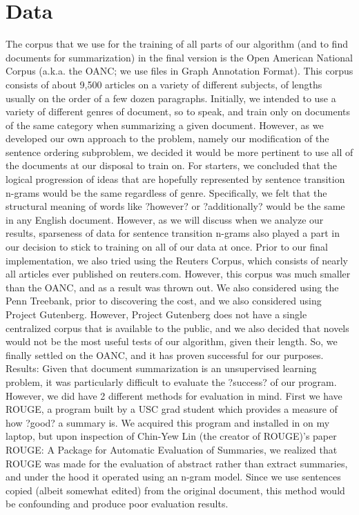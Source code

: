 \documentclass[12pt]{article}
\theoremstyle{plain}
\theoremstyle{definition}
\theoremstyle{remark}
\theoremstyle{plain}
\begin{document}
\section{Data}
	The corpus that we use for the training of all parts of our algorithm (and to find documents for summarization) in the final version is the Open American National Corpus (a.k.a. the OANC; we use files in Graph Annotation Format). This corpus consists of about 9,500 articles on a variety of different subjects, of lengths usually on the order of a few dozen paragraphs. 
Initially, we intended to use a variety of different genres of document, so to speak, and train only on documents of the same category when summarizing a given document. However, as we developed our own approach to the problem, namely our modification of the sentence ordering subproblem, we decided it would be more pertinent to use all of the documents at our disposal to train on. For starters, we concluded that the logical progression of ideas that are hopefully represented by sentence transition n-grams would be the same regardless of genre. Specifically, we felt that the structural meaning of words like ?however? or ?additionally? would be the same in any English document. However, as we will discuss when we analyze our results, sparseness of data for sentence transition n-grams also played a part in our decision to stick to training on all of our data at once. 
	Prior to our final implementation, we also tried using the Reuters Corpus, which consists of nearly all articles ever published on reuters.com. However, this corpus was much smaller than the OANC, and as a result was thrown out. We also considered using the Penn Treebank, prior to discovering the cost, and we also considered using Project Gutenberg. However, Project Gutenberg does not have a single centralized corpus that is available to the public, and we also decided that novels would not be the most useful tests of our algorithm, given their length. So, we finally settled on the OANC, and it has proven successful for our purposes.
Results:
	Given that document summarization is an unsupervised learning problem, it was particularly difficult to evaluate the ?success? of our program. However, we did have 2 different methods for evaluation in mind. First we have ROUGE, a program built by a USC grad student which provides a measure of how ?good? a summary is. We acquired this program and installed in on my laptop, but upon inspection of Chin-Yew Lin (the creator of ROUGE)'s paper ROUGE: A Package for Automatic Evaluation of Summaries, we realized that ROUGE was made for the evaluation of abstract rather than extract summaries, and under the hood it operated using an n-gram model. Since we use sentences copied (albeit somewhat edited) from the original document, this method would be confounding and produce poor evaluation results.
\end{document}
